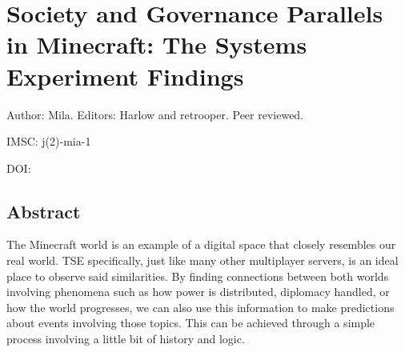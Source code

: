 \chapter{Society and Governance Parallels in Minecraft: The Systems Experiment Findings}

\begin{center}
    Author: Mila. Editors: Harlow and retrooper. Peer reviewed. %
\end{center}

\begin{flushright}
    IMSC: j(2)-mia-1

    DOI: 
\end{flushright}

\section*{Abstract}
The Minecraft world is an example of a digital space that closely resembles our real world. TSE specifically, just like many other multiplayer servers, is an ideal place to observe said similarities. By finding connections between both worlds involving phenomena such as how power is distributed, diplomacy handled, or how the world progresses, we can also use this information to make predictions about events involving those topics. This can be achieved through a simple process involving a little bit of history and logic.

